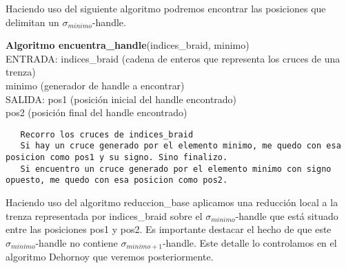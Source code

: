 Haciendo uso del siguiente algoritmo podremos encontrar las posiciones que delimitan un $\sigma_{minimo}$-handle.
\begin{alg}
	\textbf{Algoritmo encuentra\_handle}(indices\_braid, minimo)\\
	ENTRADA: indices\_braid (cadena de enteros que representa los cruces de una trenza)\\
	\hspace*{2.2cm} minimo (generador de handle a encontrar) \\
	SALIDA: \hspace{0.4cm} pos1 (posición inicial del handle encontrado) \\
	\hspace*{2.2cm} pos2 (posición final del handle encontrado)
	
\begin{lstlisting}
   Recorro los cruces de indices_braid
   Si hay un cruce generado por el elemento minimo, me quedo con esa posicion como pos1 y su signo. Sino finalizo.
   Si encuentro un cruce generado por el elemento minimo con signo opuesto, me quedo con esa posicion como pos2.
\end{lstlisting}
\end{alg}

\bigskip
Haciendo uso del algoritmo reduccion\_base aplicamos una reducción local a la trenza representada por indices\_braid sobre el $\sigma_{minimo}$-handle que está situado entre las posiciones pos1 y pos2. Es importante destacar el hecho de que este $\sigma_{minimo}$-handle  no contiene $\sigma_{minimo+1}$-handle. Este detalle lo controlamos en el algoritmo Dehornoy que veremos posteriormente. \\

